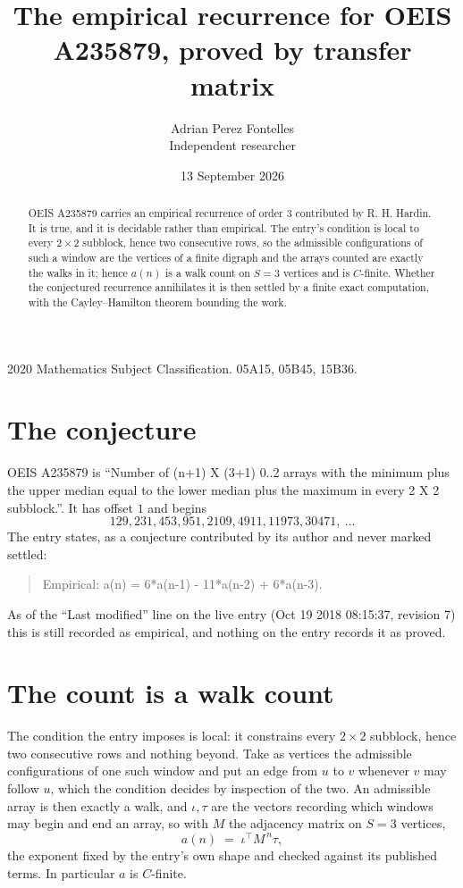 \documentclass[11pt,a4paper]{article}
\title{The empirical recurrence for OEIS A235879, proved by transfer matrix}
\author{Adrian Perez Fontelles\\ \small Independent researcher}
\date{13 September 2026}
\theoremstyle{plain}
\theoremstyle{definition}
\begin{document}
\maketitle

\begin{abstract}
OEIS A235879 carries an empirical recurrence of order $3$ contributed by R. H. Hardin. It is
true, and it is decidable rather than empirical. The entry's condition is local to every $2\times2$ subblock, hence two consecutive rows, so
the admissible configurations of such a window are the vertices of a finite digraph and the
arrays counted are exactly the walks in it; hence $a(n)$ is a walk count on $S=3$ vertices
and is $C$-finite. Whether the conjectured recurrence annihilates it is then settled by a
finite exact computation, with the Cayley--Hamilton theorem bounding the work.
\end{abstract}

\noindent\small 2020 Mathematics Subject Classification. 05A15, 05B45, 15B36.\normalsize

\section{The conjecture}

OEIS A235879 is ``Number of (n+1) X (3+1) 0..2 arrays with the minimum plus the upper median equal to the lower median plus the maximum in every 2 X 2 subblock.''. It has offset $1$ and begins
\[
129, 231, 453, 951, 2109, 4911, 11973, 30471,\ \dots
\]
The entry states, as a conjecture contributed by its author and never marked settled:
\begin{quote}
Empirical: a(n) = 6*a(n-1) - 11*a(n-2) + 6*a(n-3).
\end{quote}
As of the ``Last modified'' line on the live entry (Oct 19 2018 08:15:37, revision 7) this is still
recorded as empirical, and nothing on the entry records it as proved.

\section{The count is a walk count}

The condition the entry imposes is local: it constrains every $2\times2$ subblock, hence two consecutive rows and nothing beyond. Take as vertices the admissible configurations of one such window and put an edge from $u$ to $v$ whenever $v$ may follow $u$, which the condition decides by inspection of the two.
An admissible array is then exactly a walk, and $\iota,\tau$ are the vectors recording which windows may begin and end an array, so with $M$ the adjacency matrix on $S=3$ vertices,
\[
a(n)\;=\;\iota^{\!\top}M^{\,n}\tau ,
\]
the exponent fixed by the entry's own shape and checked against its published terms. In
particular $a$ is $C$-finite.
\end{document}
